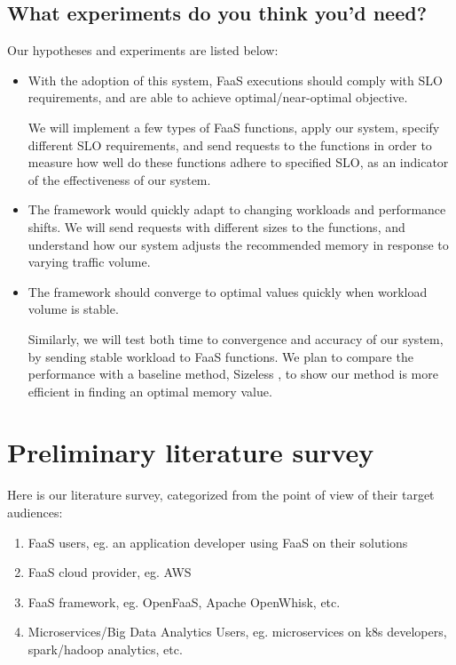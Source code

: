 \documentclass[conference]{IEEEtran}
\begin{document}
\subsection{What experiments do you think you'd need?}
Our hypotheses and experiments are listed below: 
\begin{itemize}
\item With the adoption of this system, FaaS executions should comply with SLO requirements, and are able to achieve optimal/near-optimal objective.

We will implement a few types of FaaS functions, apply our system, specify different SLO requirements, and send requests to the functions in order to measure how well do these functions adhere to specified SLO, as an indicator of the effectiveness of our system.


\item The framework would quickly adapt to changing workloads and performance shifts.
We will send requests with different sizes to the functions, and understand how our system adjusts the recommended memory in response to varying traffic volume.

\item The framework should converge to optimal values quickly when workload volume is stable.

Similarly, we will test both time to convergence and accuracy of our system, by sending stable workload to FaaS functions. We plan to compare the performance with a baseline method, Sizeless \cite{10.1145/3464298.3493398}, to show our method is more efficient in finding an optimal memory value.
\end{itemize}




\section{Preliminary literature survey}

Here is our literature survey, categorized from the point of view of their target audiences:

\begin{enumerate}[label=\Alph*.]
    \item FaaS users, eg. an application developer using FaaS on their solutions
    \item FaaS cloud provider, eg. AWS
    \item FaaS framework, eg. OpenFaaS, Apache OpenWhisk, etc.
    \item Microservices/Big Data Analytics Users, eg. microservices on k8s developers, spark/hadoop analytics, etc.
\end{enumerate}
\end{document}
